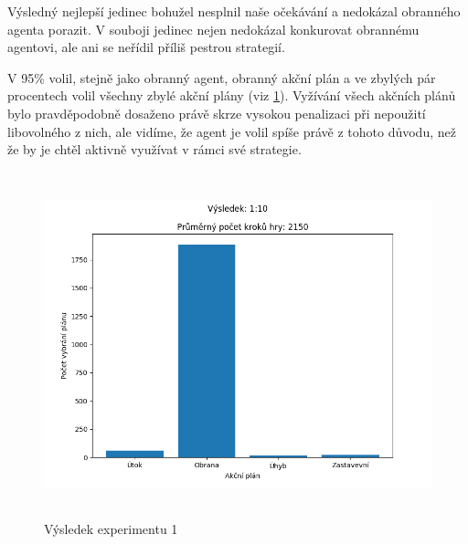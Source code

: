Výsledný nejlepší jedinec bohužel nesplnil naše očekávání a nedokázal obranného agenta porazit. 
V souboji jedinec nejen nedokázal konkurovat obrannému agentovi, ale ani se neřídil příliš pestrou strategií.

V 95\% volil, stejně jako obranný agent, obranný akční plán a ve zbylých pár procentech volil všechny zbylé akční plány (viz \ref{Výsledek experimentu 01}).
Vyžívání všech akčních plánů bylo pravděpodobně dosaženo právě skrze vysokou penalizaci při nepoužití libovolného z nich, ale vidíme, že agent je volil spíše právě z tohoto důvodu, než že by je chtěl aktivně využívat v rámci své strategie.

\begin{figure}[H]\centering
\includegraphics[width=125mm, height=100mm]{./Obrazky/Experiment01Results.png}
\caption{Výsledek experimentu 1}
\label{Výsledek experimentu 01}
\end{figure}


